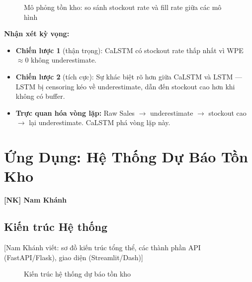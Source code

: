 \documentclass[12pt,a4paper]{report}
\newcommand{\ownerNK}{\colorbox{blue!15}{\textbf{[NK] Nam Khánh}}}
\begin{document}
\begin{figure}[H]
    \centering
    \caption{Mô phỏng tồn kho: so sánh stockout rate và fill rate giữa các mô hình}
\end{figure}

\textbf{Nhận xét kỳ vọng:}
\begin{itemize}
    \item \textbf{Chiến lược 1} (thận trọng): CaLSTM có stockout rate thấp nhất vì WPE $\approx 0$ không underestimate.
    \item \textbf{Chiến lược 2} (tích cực): Sự khác biệt rõ hơn giữa CaLSTM và LSTM --- LSTM bị censoring kéo về underestimate, dẫn đến stockout cao hơn khi không có buffer.
    \item \textbf{Trực quan hóa vòng lặp:} Raw Sales $\to$ underestimate $\to$ stockout cao $\to$ lại underestimate. CaLSTM phá vòng lặp này.
\end{itemize}

\newpage

\chapter{Ứng Dụng: Hệ Thống Dự Báo Tồn Kho}
\ownerNK

\section{Kiến trúc Hệ thống}

[Nam Khánh viết: sơ đồ kiến trúc tổng thể, các thành phần API (FastAPI/Flask), giao diện (Streamlit/Dash)]

\begin{figure}[H]
\centering
{}
\caption{Kiến trúc hệ thống dự báo tồn kho}
\end{figure}
\end{document}
